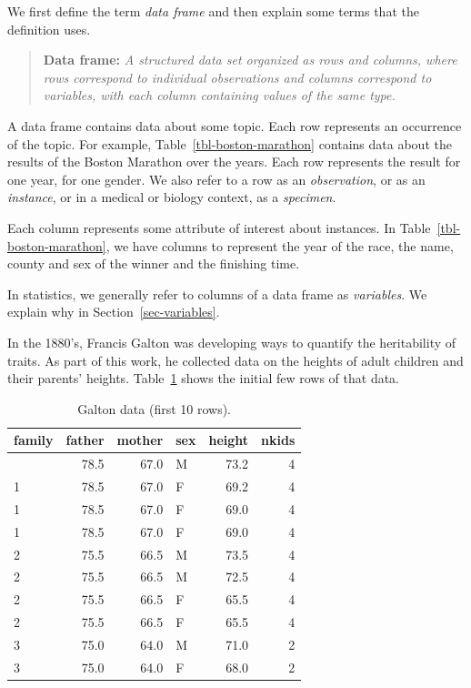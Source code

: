 \documentclass[
  12pt,
  letterpaper,
  DIV=11,
  numbers=noendperiod]{scrreprt}
\begin{document}
We first define the term \emph{data frame} and then explain some terms
that the definition uses.

\begin{quote}
\textbf{Data frame:} \emph{A structured data set organized as rows and
columns, where rows correspond to individual observations and columns
correspond to variables, with each column containing values of the same
type.}
\end{quote}

A data frame contains data about some topic. Each row represents an
occurrence of the topic. For example, Table~\ref{tbl-boston-marathon}
contains data about the results of the Boston Marathon over the years.
Each row represents the result for one year, for one gender. We also
refer to a row as an \emph{observation}, or as an \emph{instance}, or in
a medical or biology context, as a \emph{specimen}.

Each column represents some attribute of interest about instances. In
Table~\ref{tbl-boston-marathon}, we have columns to represent the year
of the race, the name, county and sex of the winner and the finishing
time.

In statistics, we generally refer to columns of a data frame as
\emph{variables}. We explain why in Section~\ref{sec-variables}.

In the 1880's, Francis Galton was developing ways to quantify the
heritability of traits. As part of this work, he collected data on the
heights of adult children and their parents' heights.
Table~\ref{tbl-galton} shows the initial few rows of that data.

\begin{longtable}[]{@{}lrrlrr@{}}

\caption{\label{tbl-galton}Galton data (first 10 rows).}

\tabularnewline

\toprule\noalign{}
family & father & mother & sex & height & nkids \\
\midrule\noalign{}
\endhead
\bottomrule\noalign{}
\endlastfoot
1 & 78.5 & 67.0 & M & 73.2 & 4 \\
1 & 78.5 & 67.0 & F & 69.2 & 4 \\
1 & 78.5 & 67.0 & F & 69.0 & 4 \\
1 & 78.5 & 67.0 & F & 69.0 & 4 \\
2 & 75.5 & 66.5 & M & 73.5 & 4 \\
2 & 75.5 & 66.5 & M & 72.5 & 4 \\
2 & 75.5 & 66.5 & F & 65.5 & 4 \\
2 & 75.5 & 66.5 & F & 65.5 & 4 \\
3 & 75.0 & 64.0 & M & 71.0 & 2 \\
3 & 75.0 & 64.0 & F & 68.0 & 2 \\

\end{longtable}
\end{document}
